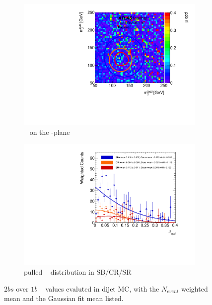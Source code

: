 \begin{figure}[htbp!]
\centering
\captionsetup{justification=centering}
	\hspace{-1cm}
    \begin{subfigure}[b]{0.4\textwidth}
        \includegraphics[width=\textwidth,angle=-90]{figures/boosted/AppendixMuqcdstudy/QCD_TwoTag_split_Incl_mH0H1.pdf}
        \caption{\muqcd~ on the \mleadJ-\msublJ plane}
        \label{fig:app-muqcd-2bs-2d-qcd}
    \end{subfigure}
    \quad \quad \quad \quad 
    \begin{subfigure}[b]{0.4\textwidth}
        \includegraphics[width=\textwidth,angle=-90]{figures/boosted/AppendixMuqcdstudy/QCD_TwoTag_split_Incl_mH0H1_pull.pdf}
        \caption{pulled \muqcd~ distribution in SB/CR/SR}
        \label{fig:app-muqcd-2bs-pull-qcd}
    \end{subfigure}
\caption{$2bs$ over $1b$ \muqcd~ values evaluted in dijet MC, with the $N_{event}$ weighted mean and the Gaussian fit mean listed.}
\label{fig:app-muqcd-2bs-qcd}
\end{figure}

